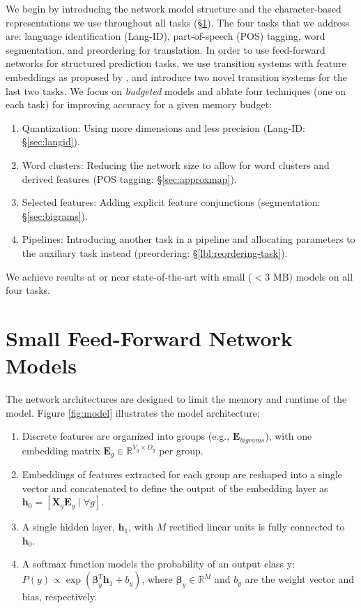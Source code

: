 \documentclass[11pt,letterpaper]{article}
\begin{document}
We begin by introducing the network model structure and the character-based
representations we use throughout all tasks (\S\ref{sec:network}).
The four tasks that we address are: language identification (Lang-ID), part-of-speech (POS) tagging, word segmentation, and preordering for translation.
In order to use feed-forward networks for structured prediction tasks, 
we use transition systems \cite{titov2007fast,titov2010latent} with feature embeddings as proposed by ,
and introduce two novel transition systems for the last two tasks.
We focus on \emph{budgeted} models
and ablate four techniques (one on each task)
for improving accuracy for a given memory budget:
\begin{enumerate}[topsep=3pt,itemsep=0pt]
\item Quantization: Using more dimensions and less precision (Lang-ID: \S\ref{sec:langid}).
\item Word clusters: Reducing the network size to allow for word clusters and derived features (POS tagging:  \S\ref{sec:approxmap}).
\item Selected features: Adding explicit feature conjunctions (segmentation:  \S\ref{sec:bigrams}).
\item Pipelines: Introducing another task in a pipeline and allocating parameters to the auxiliary task instead (preordering:  \S\ref{lbl:reordering-task}). 
\end{enumerate}
We achieve results at or near state-of-the-art with small ($< 3$ MB) models on all four tasks.

\section{Small Feed-Forward Network Models}
\label{sec:network}
The network architectures are designed to
limit the memory and runtime of the model.
Figure \ref{fig:model} illustrates the model architecture:
\begin{enumerate}[topsep=3pt,itemsep=0pt]  %
\item Discrete features are organized into groups (e.g., $\mathbf{E}_{\textit{bigrams}}$), with one embedding matrix $\mathbf{E}_g \in \mathbb{R}^{V_g \times D_g}$ per group.
\item Embeddings of features extracted for each group are reshaped into a single vector and concatenated to define the output of the embedding layer as
$\mathbf{h}_0 = [\mathbf{X}_g \mathbf{E}_g \;|\; \forall g ]$.
\item A single hidden layer, $\mathbf{h}_1$, with $M$ rectified linear units \cite{relu} is fully connected to $\mathbf{h}_0$.
\item A softmax function models the probability of an output class y: $P(y) \propto \exp(\mathbf{\beta}_y^T\mathbf{h}_1 + b_y)$, where $\mathbf{\beta}_y \in \mathbb{R}^{M}$ and $b_y$ are the weight vector and bias, respectively.
\end{enumerate}
\end{document}
